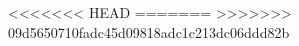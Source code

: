 \newcommand{\ivoaDocversion}{0.1}
<<<<<<< HEAD
\newcommand{\ivoaDocdate}{2024-04-18}
\newcommand{\ivoaDocdatecode}{20240418}
=======
\newcommand{\ivoaDocdate}{2024-05-03}
\newcommand{\ivoaDocdatecode}{20240503}
>>>>>>> 09d5650710fadc45d09818adc1c213dc06ddd82b
\newcommand{\ivoaDoctype}{WD}
\newcommand{\ivoaDocname}{MANGO}
